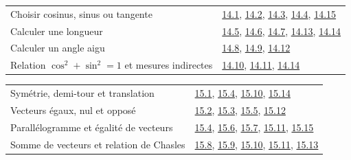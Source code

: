\begin{tabularx}{\linewidth}{@{}Yl@{}}\toprule
Choisir cosinus, sinus ou tangente & \hyperref[exo-14-1]{14.1}, \hyperref[exo-14-2]{14.2}, \hyperref[exo-14-3]{14.3}, \hyperref[exo-14-4]{14.4}, \hyperref[exo-14-15]{14.15}\\[2mm]
Calculer une longueur & \hyperref[exo-14-5]{14.5}, \hyperref[exo-14-6]{14.6}, \hyperref[exo-14-7]{14.7}, \hyperref[exo-14-13]{14.13}, \hyperref[exo-14-14]{14.14}\\[2mm]
Calculer un angle aigu & \hyperref[exo-14-8]{14.8}, \hyperref[exo-14-9]{14.9}, \hyperref[exo-14-12]{14.12}\\[2mm]
Relation $\cos^2+\sin^2=1$ et mesures indirectes & \hyperref[exo-14-10]{14.10}, \hyperref[exo-14-11]{14.11}, \hyperref[exo-14-14]{14.14}\\[2mm]
\bottomrule\end{tabularx}\par\vspace{4mm}
\begin{tabularx}{\linewidth}{@{}Yl@{}}\toprule
Symétrie, demi-tour et translation & \hyperref[exo-15-1]{15.1}, \hyperref[exo-15-4]{15.4}, \hyperref[exo-15-10]{15.10}, \hyperref[exo-15-14]{15.14}\\[2mm]
Vecteurs égaux, nul et opposé & \hyperref[exo-15-2]{15.2}, \hyperref[exo-15-3]{15.3}, \hyperref[exo-15-5]{15.5}, \hyperref[exo-15-12]{15.12}\\[2mm]
Parallélogramme et égalité de vecteurs & \hyperref[exo-15-4]{15.4}, \hyperref[exo-15-6]{15.6}, \hyperref[exo-15-7]{15.7}, \hyperref[exo-15-11]{15.11}, \hyperref[exo-15-15]{15.15}\\[2mm]
Somme de vecteurs et relation de Chasles & \hyperref[exo-15-8]{15.8}, \hyperref[exo-15-9]{15.9}, \hyperref[exo-15-10]{15.10}, \hyperref[exo-15-11]{15.11}, \hyperref[exo-15-13]{15.13}\\[2mm]
\bottomrule\end{tabularx}\par\vspace{4mm}
\clearpage
{}\fontsize{10}{13}\selectfont

